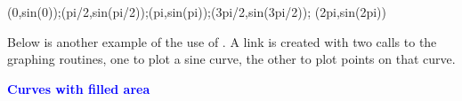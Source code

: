 \documentclass{article}
\begin{document}
    {(0,sin(0));(pi/2,sin(pi/2));(pi,sin(pi));(3pi/2,sin(3pi/2));
    (2pi,sin(2pi))}{\mySinePoints}

Below is another example of the use of
\texttt{\string{}}. A link is created with two calls to
the graphing routines, one to plot a sine curve, the other to plot
points on that curve.
%


\newpage


\begin{center}
    {\large\textbf{\textcolor{blue}{Curves with filled area}}}\\[3ex]
    \graphScreen[poster=aflogo]{\hScreenGraph}{\vScreenGraph}\par\smallskip
    \makebox[\hScreenGraph][c]{\small\graphClrBtn{}{11bp}}
\end{center}
\end{document}
